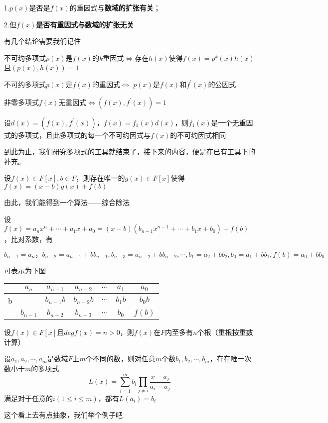 \documentclass[lang=cn,10pt]{elegantbook}
\begin{document}
1.$p(x)$是否是$f(x)$的重因式与\textbf{数域的扩张有关}；

2.但$f(x)$\textbf{是否有重因式与数域的扩张无关}

有几个结论需要我们记住
\begin{conclusion}
	不可约多项式$p(x)$是$f(x)$的$k$重因式$\Leftrightarrow$存在$h(x)$使得$f(x)=p^k(x)h(x)$且$(p(x),h(x))=1$
\end{conclusion}
\begin{conclusion}
	不可约多项式$p(x)$是$f(x)$的重因式$\Leftrightarrow$ $p(x)$是$f(x)$和$f^\prime(x)$的公因式
	
	非零多项式$f(x)$无重因式$\Leftrightarrow(f(x),f^\prime(x))=1$
\end{conclusion}
\begin{conclusion}
	设$d(x)=(f(x),f^\prime(x))，f(x)=f_1(x)d(x)$，则$f_1(x)$是一个无重因式的多项式，且此多项式的每一个不可约因式与$f(x)$的不可约因式相同
\end{conclusion}
到此为止，我们研究多项式的工具就结束了，接下来的内容，便是在已有工具下的补充。

\begin{theorem}[余数定理]
	设$f(x)\in F[x],b∈F$，则存在唯一的$g(x)\in F[x]$使得$f(x)=(x-b)g(x)+f(b)$
\end{theorem}
由此，我们能得到一个算法——综合除法
\begin{definition}[综合除法]
	设$f(x)=a_nx^n+\cdots+a_1x+a_0=(x-b)(b_{n-1}x^{n-1}+\cdots+b_1x+b_0)+f(b)$，比对系数，有
	
	$b_{n-1}=a_n，b_{n-2}=a_{n-1}+bb_{n-1},b_{n-3}=a_{n-2}+bb_{n-2},\cdots,b_1=a_2+bb_2,b_0=a_1+bb_1,f(b)=a_0+bb_0$
\end{definition}
可表示为下图

\begin{tabular}{|c|c|c|c|c|c|c|}
	\hline
	& $a_{n}$ & $a_{n-1}$ &$a_{n-2}$  & $\cdots$ &$ a_{1}$ & $a_{0}$ \\
	\hline
	b&  &$b_{n-1}b$  & $ b_{n-2}b$ & $\cdots$ & $ b_{1}b$ &$ b_{0}b$  \\
	\hline
	& $b_{n-1}$ &$ b_{n-2}$ &$ b_{n-3}$  & $ \cdots$ & $ b_{0}$ &$f(b)$  \\
	\hline
\end{tabular}
\begin{theorem}
	设$f(x)\in F[x]$且$deg{f}(x)=n>0$，则$f(x)$在$F$内至多有$n$个根（重根按重数计算）
\end{theorem}
\begin{definition}[Lagrange插值公式]
	设$a_1,a_2,\cdots,a_m$是数域$F$上$m$个不同的数，则对任意$m$个数$b_1,b_2,\cdots,b_m$，存在唯一次数小于$m$的多项式
	\begin{equation*}
		L(x)=\sum_{i=1}^{m}b_i\prod_{j\neq i}\frac{x-a_j}{a_i-a_j}
	\end{equation*}
	满足对于任意的$i(1\le i\le m)$，都有$L(a_i)=b_i$
\end{definition}
这个看上去有点抽象，我们举个例子吧
\end{document}
